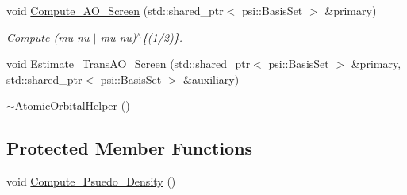 \begin{DoxyCompactItemize}
\item 
void \mbox{\hyperlink{classforte_1_1_atomic_orbital_helper_a177bf2b84d858251fceb166a71b12119}{Compute\+\_\+\+A\+O\+\_\+\+Screen}} (std\+::shared\+\_\+ptr$<$ psi\+::\+Basis\+Set $>$ \&primary)
\begin{DoxyCompactList}\small\item\em Compute (mu nu $\vert$ mu nu)$^\wedge$\{(1/2)\}. \end{DoxyCompactList}\item 
void \mbox{\hyperlink{classforte_1_1_atomic_orbital_helper_a19898dcd4ea53638b54ce7821982f900}{Estimate\+\_\+\+Trans\+A\+O\+\_\+\+Screen}} (std\+::shared\+\_\+ptr$<$ psi\+::\+Basis\+Set $>$ \&primary, std\+::shared\+\_\+ptr$<$ psi\+::\+Basis\+Set $>$ \&auxiliary)
\item 
\mbox{\hyperlink{classforte_1_1_atomic_orbital_helper_a6b46a292d87abe345f8c68e3dd442fcf}{$\sim$\+Atomic\+Orbital\+Helper}} ()
\end{DoxyCompactItemize}
\subsection*{Protected Member Functions}
\begin{DoxyCompactItemize}
\item 
void \mbox{\hyperlink{classforte_1_1_atomic_orbital_helper_aaf06be8bb2f953d576c5df623a4207cb}{Compute\+\_\+\+Psuedo\+\_\+\+Density}} ()
\end{DoxyCompactItemize}

